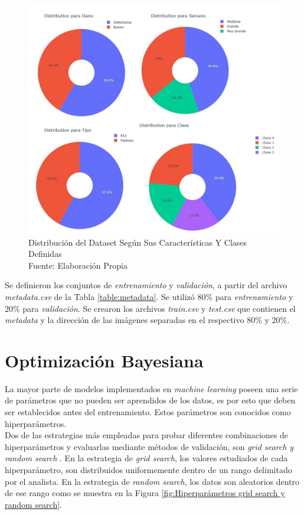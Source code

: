\begin{figure}[ht]
	\centering
	\includegraphics[scale=0.42]{Figs/Distribucion.jpg}
	\caption{Distribución del Dataset Según Sus Características Y Clases Definidas \\ Fuente: Elaboración Propia}
	\label{fig:distribuciontipo}
\end{figure}

\newpage
Se definieron los conjuntos de \textit{entrenamiento} y \textit{validación}, a partir del archivo \textit{metadata.csv} de la Tabla \ref{table:metadata}. Se utilizó $80\%$ para \textit{entrenamiento} y $20\%$ para \textit{validación}. Se crearon los archivos \textit{train.csv} y \textit{test.csv} que contienen el \textit{metadata} y la dirección de las imágenes separadas en el respectivo $80\%$ y $20\%$.\\

\section{Optimización Bayesiana}

La mayor parte de modelos implementados en \textit{machine learning} poseen una serie de parámetros que no pueden ser aprendidos de los datos, es por esto que deben ser establecidos antes del entrenamiento. Estos parámetros son conocidos como hiperparámetros. \\

Dos de las estrategias más empleadas para probar diferentes combinaciones de hiperparámetros y evaluarlas mediante métodos de validación, son \textit{grid search y random search} \cite{liashchynskyi2019grid}. En la estrategia de \textit{grid search}, los valores estudiados de cada hiperparámetro, son distribuidos uniformemente dentro de un rango delimitado por el analista. En la estrategia de \textit{random search}, los datos son aleatorios dentro de ese rango como se muestra en la Figura \ref{fig:Hiperparámetros grid search y random search}.

